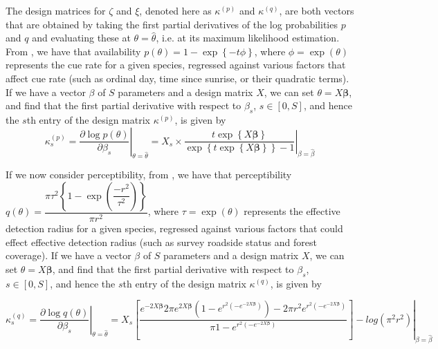 \par The design matrices for $\zeta$ and $\xi$, denoted here as $\kappa^{(p)}$ and $\kappa^{(q)}$, are both vectors that are obtained by taking the first partial derivatives of the log probabilities $p$ and $q$ and evaluating these at $\theta = \hat{\theta}$, i.e. at its maximum likelihood estimation. 
From \citet{solymos_calibrating_2013}, we have that availability $p(\theta) = 1 - \exp\left\{-t\phi\right\}$, where $\phi = \exp\left(\theta\right)$ represents the cue rate for a given species, regressed against various factors that affect cue rate (such as ordinal day, time since sunrise, or their quadratic terms). 
If we have a vector {\boldmath$\beta$} of $S$ parameters and a design matrix $X$, we can set $\theta = X\boldsymbol{\beta}$, and find that the first partial derivative with respect to $\beta_s$, $s \in \left[0, S\right]$, and hence the $s$th entry of the design matrix $\kappa^{(p)}$, is given by
\begin{equation*}\label{kappa_p}
	\kappa_{s}^{(p)} = \left.\dfrac{\partial \log p(\theta)}{\partial \beta_s}\right\vert_{\theta = \hat{\theta}} = \left. X_s \times \dfrac{t \exp\left\{X\boldsymbol{\beta}\right\}}{\exp\left\{t \exp\left\{X\boldsymbol{\beta}\right\}\right\} - 1} \right\vert_{\beta = \hat{\beta}}
\end{equation*}

\par If we now consider perceptibility, from \citet{solymos_calibrating_2013}, we have that perceptibility $q(\theta) = \dfrac{\pi \tau^2 \left\{1 - \exp\left(\dfrac{-r^2}{\tau^2}\right)\right\}}{\pi r^2}$, where $\tau = \exp(\theta)$ represents the effective detection radius for a given species, regressed against various factors that could effect effective detection radius (such as survey roadside status and forest coverage). 
If we have a vector {\boldmath$\beta$} of $S$ parameters and a design matrix $X$, we can set $\theta = X\boldsymbol{\beta}$, and find that the first partial derivative with respect to $\beta_s$, $s \in \left[0, S\right]$, and hence the $s$th entry of the design matrix $\kappa^{(q)}$, is given by

\begin{equation*}\label{kappa_q}
	\kappa_{s}^{(q)} = \left. \dfrac{\partial \log q(\theta)}{\partial \beta_s} \right\vert_{\theta = \hat{\theta}}= \left. X_s \left[\dfrac{{e^{-2X\boldsymbol{\beta}}} {2 \pi  e^{2X\boldsymbol{\beta}}} {\left(1 - e^{r^2 \left(-e^{-2X\boldsymbol{\beta}}\right)}\right)} - {2\pi r^2} {e^{r^2 \left(-e^{-2X\boldsymbol{\beta}}\right)}}}             {\pi {1-e^{r^2 \left(-e^{-2X\boldsymbol{\beta}}\right)}}}\right]  - log(\pi^2r^2) \right\vert_{\beta = \hat{\beta}}
\end{equation*}

